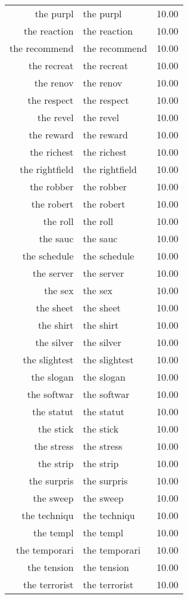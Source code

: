 \begin{table}[ht]
\begin{tabular}{rlr}
  the purpl & the purpl & 10.00 \\ 
  the reaction & the reaction & 10.00 \\ 
  the recommend & the recommend & 10.00 \\ 
  the recreat & the recreat & 10.00 \\ 
  the renov & the renov & 10.00 \\ 
  the respect & the respect & 10.00 \\ 
  the revel & the revel & 10.00 \\ 
  the reward & the reward & 10.00 \\ 
  the richest & the richest & 10.00 \\ 
  the rightfield & the rightfield & 10.00 \\ 
  the robber & the robber & 10.00 \\ 
  the robert & the robert & 10.00 \\ 
  the roll & the roll & 10.00 \\ 
  the sauc & the sauc & 10.00 \\ 
  the schedule & the schedule & 10.00 \\ 
  the server & the server & 10.00 \\ 
  the sex & the sex & 10.00 \\ 
  the sheet & the sheet & 10.00 \\ 
  the shirt & the shirt & 10.00 \\ 
  the silver & the silver & 10.00 \\ 
  the slightest & the slightest & 10.00 \\ 
  the slogan & the slogan & 10.00 \\ 
  the softwar & the softwar & 10.00 \\ 
  the statut & the statut & 10.00 \\ 
  the stick & the stick & 10.00 \\ 
  the stress & the stress & 10.00 \\ 
  the strip & the strip & 10.00 \\ 
  the surpris & the surpris & 10.00 \\ 
  the sweep & the sweep & 10.00 \\ 
  the techniqu & the techniqu & 10.00 \\ 
  the templ & the templ & 10.00 \\ 
  the temporari & the temporari & 10.00 \\ 
  the tension & the tension & 10.00 \\ 
  the terrorist & the terrorist & 10.00 \\ 

\end{tabular}
\end{table}
